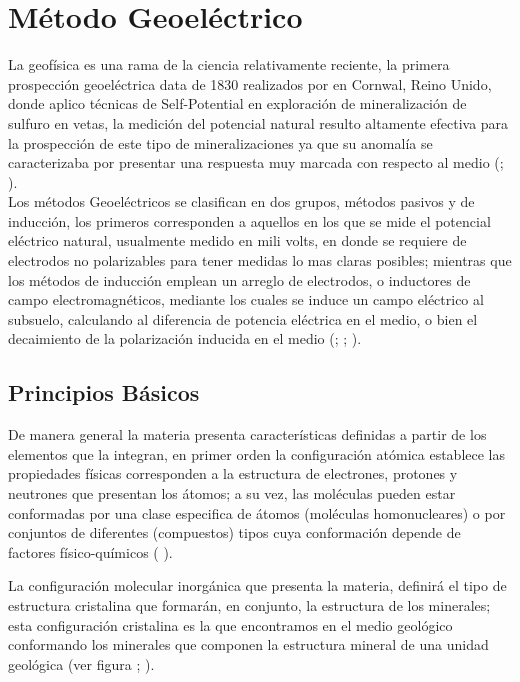 	\section{Método Geoeléctrico}
		La geofísica es una rama de la ciencia relativamente reciente, la primera prospección geoeléctrica data de 1830 realizados por \cite{fox1830} en Cornwal, Reino Unido, donde aplico técnicas de Self-Potential en exploración de mineralización de sulfuro en vetas, la medición del potencial natural resulto altamente efectiva para la prospección de este tipo de mineralizaciones ya que su anomalía se caracterizaba por presentar una respuesta muy marcada con respecto al medio (\cite{revil2013}; \cite{reynolds2011}).\\
		Los métodos Geoeléctricos se clasifican en dos grupos, métodos pasivos y de inducción, los primeros corresponden a aquellos en los que se mide el potencial eléctrico natural, usualmente medido en mili volts, en donde se requiere de electrodos no polarizables para tener medidas lo mas claras posibles; mientras que los métodos de inducción emplean un arreglo de electrodos, o inductores de campo electromagnéticos, mediante los cuales se induce un campo eléctrico al subsuelo, calculando al diferencia de potencia eléctrica en el medio, o bien el decaimiento de la polarización inducida en el medio (\cite{revil2013}; \cite{reynolds2011}; \cite{igboama2023}).\\
		
		
		\subsection{Principios Básicos}
		
			De manera general la materia presenta características definidas a partir de los elementos que la integran, en primer orden la configuración atómica establece las propiedades físicas corresponden a la estructura de electrones, protones y neutrones que presentan los átomos; a su vez, las moléculas pueden estar conformadas por una clase especifica de átomos (moléculas homonucleares) o por conjuntos de diferentes (compuestos) tipos cuya conformación depende de factores físico-químicos ( \cite{tiab2024}).%
			
			La configuración molecular inorgánica que presenta la materia, definirá el tipo de estructura cristalina que formarán, en conjunto, la estructura de los minerales; esta configuración cristalina es la que encontramos en el medio geológico conformando los minerales que componen la estructura mineral de una unidad geológica (ver figura \cite{tiab2024}; \cite{gandhi2016}).\\
